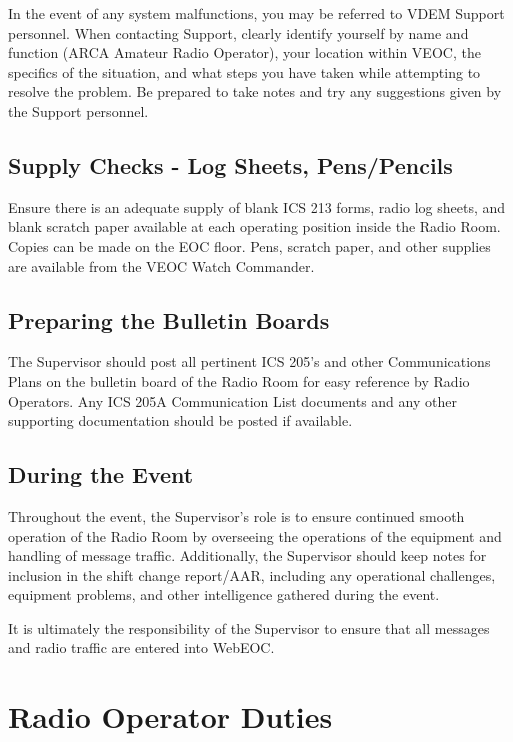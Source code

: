 \documentclass[pdflatex,letterpaper,twoside,12pt]{book}
\begin{document}
In the event of any system malfunctions, you may be referred to VDEM Support personnel.  When contacting Support, clearly identify yourself by name and function (ARCA Amateur Radio Operator), your location within VEOC, the specifics of the situation, and what steps you have taken while attempting to resolve the problem.  Be prepared to take notes and try any suggestions given by the Support personnel.

\subsection{Supply Checks - Log Sheets, Pens/Pencils}

Ensure there is an adequate supply of blank ICS 213 forms, radio log sheets, and blank scratch paper available at each operating position inside the Radio Room.  Copies can be made on the EOC floor.  Pens, scratch paper, and other supplies are available from the VEOC Watch Commander.

\subsection{Preparing the Bulletin Boards}

The Supervisor should post all pertinent ICS 205's and other Communications Plans on the bulletin board of the Radio Room for easy reference by Radio Operators.  Any ICS 205A Communication List documents and any other supporting documentation should be posted if available.

\subsection{During the Event}

Throughout the event, the Supervisor's role is to ensure continued smooth operation of the Radio Room by overseeing the operations of the equipment and handling of message traffic.  Additionally, the Supervisor should keep notes for inclusion in the shift change report/AAR, including any operational challenges, equipment problems, and other intelligence gathered during the event.

It is ultimately the responsibility of the Supervisor to ensure that all messages and radio traffic are entered into WebEOC.


\section{Radio Operator Duties}
\end{document}
